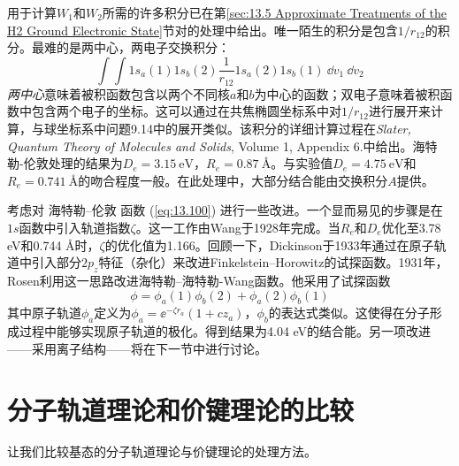     用于计算$W_1$和$W_2$所需的许多积分已在第\ref{sec:13.5 Approximate Treatments of the H2 Ground Electronic State}节对的处理中给出。唯一陌生的积分是包含$1/r_{12}$的积分。最难的是两中心，两电子交换积分：
    \begin{equation*}
        \int \int 1s_a\left(1\right)1s_b\left(2\right)\frac{1}{r_{12}}1s_a\left(2\right)1s_b\left(1\right) \:\dd v_1\:\dd v_2
    \end{equation*}
    \textit{两中心}意味着被积函数包含以两个不同核$a$和$b$为中心的函数；双电子意味着被积函数中包含两个电子的坐标。这可以通过在共焦椭圆坐标系中对$1/r_{12}$进行展开来计算，与球坐标系中问题9.14中的展开类似。该积分的详细计算过程在\textit{Slater, Quantum Theory of Molecules and Solids}, Volume 1, Appendix 6.中给出。海特勒-伦敦处理的结果为$D_e = 3.15\:\mathrm{eV}$，$R_e = 0.87\:\mathrm{Å}$。与实验值$D_e = 4.75\:\mathrm{eV}$和$R_e = 0.741\:\mathrm{Å}$的吻合程度一般。在此处理中，大部分结合能由交换积分$A$提供。

    考虑对 海特勒–伦敦 函数 (\ref{eq:13.100}) 进行一些改进。一个显而易见的步骤是在$1s$函数中引入轨道指数$\zeta$。这一工作由Wang于1928年完成。当$R_e$和$D_e$优化至3.78 eV和0.744 Å时，$\zeta$的优化值为1.166。回顾一下，Dickinson于1933年通过在原子轨道中引入部分$2p_z$特征（杂化）来改进Finkelstein–Horowitz的试探函数。1931年，Rosen利用这一思路改进海特勒–海特勒-Wang函数。他采用了试探函数
    \begin{equation*}
        \phi = \phi_a\left(1\right)\phi_b\left(2\right) + \phi_a\left(2\right)\phi_b\left(1\right)
    \end{equation*}
    其中原子轨道$\phi_a$定义为$\phi_a = \ee ^{-\zeta r_a} \left(1 + cz_a\right)$，$\phi_b$的表达式类似。这使得在分子形成过程中能够实现原子轨道的极化。得到结果为4.04 eV的结合能。另一项改进——采用离子结构——将在下一节中进行讨论。

\section{分子轨道理论和价键理论的比较}
\label{sec:13.11 Comparison of the MO and VB Theories}

    让我们比较基态的分子轨道理论与价键理论的处理方法。

